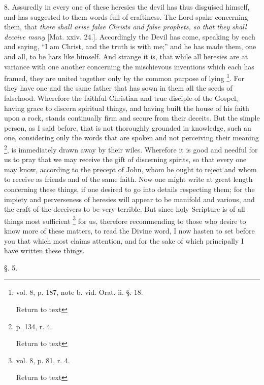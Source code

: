 8. Assuredly in every one of these heresies the
devil has thus disguised himself, and has suggested to them words full
of craftiness. The Lord spake concerning them, that \emph{there shall
arise false Christs and false prophets, so that they shall deceive
many} [Mat. xxiv. 24.]. Accordingly the Devil has come, speaking by each and saying, ``I am Christ, and the truth is with me;''
and he has made them, one and all, to be liars like himself. And
strange it is, that while all heresies are at variance with one
another concerning the mischievous inventions which each has framed,
they are united together only by the common purpose of lying \footnote{vol. 8, p. 187, note b. vid. Orat. ii. §. 18.

Return to text}. For they have one and the same father that has sown in them
all the seeds of falsehood. Wherefore the faithful Christian and true
disciple of the Gospel, having grace to discern spiritual things, and
having built the house of his faith upon a rock, stands continually
firm and secure from their deceits. But the simple person, as I said
before, that is not thoroughly grounded in knowledge, such an one,
considering only the words that are spoken and not perceiving their
meaning \footnote{p. 134, r. 4.

Return to text}, is
immediately drawn away by their wiles. Wherefore it is good and
needful for us to pray that we may receive the gift of discerning
spirits, so that every one may know, according to the precept of John,
whom he ought to reject and whom to receive as friends and of the same
faith. Now one might write at great length concerning these things, if
one desired to go into details respecting them; for the impiety and
perverseness of heresies will appear to be manifold and various, and
the craft of the deceivers to be very terrible. But since holy
Scripture is of all things most sufficient \footnote{vol. 8, p. 81, r. 4.

Return to text} for us, therefore recommending to those who desire to know
more of these matters, to read the Divine word, I now hasten to set
before you that which most claims attention, and for the sake of which
principally I have written these things.

§. 5.

